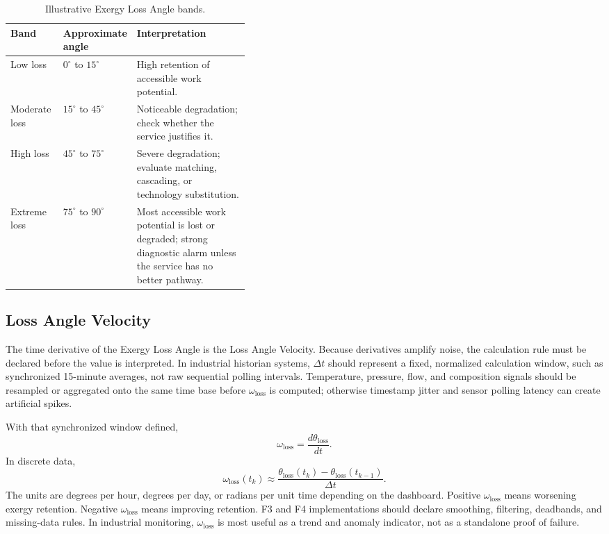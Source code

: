 \documentclass[11pt]{article}
\newcommand{\thetaloss}{\theta_{\mathrm{loss}}}
\newcommand{\omegaloss}{\omega_{\mathrm{loss}}}
\begin{document}
\begin{table}[H]
\centering
\caption{Illustrative Exergy Loss Angle bands.}
\begin{tabularx}{0.9\linewidth}{@{}p{0.22\linewidth}p{0.18\linewidth}X@{}}
\toprule
Band & Approximate angle & Interpretation \\
\midrule
Low loss & $0^{\circ}$ to $15^{\circ}$ & High retention of accessible work potential. \\
Moderate loss & $15^{\circ}$ to $45^{\circ}$ & Noticeable degradation; check whether the service justifies it. \\
High loss & $45^{\circ}$ to $75^{\circ}$ & Severe degradation; evaluate matching, cascading, or technology substitution. \\
Extreme loss & $75^{\circ}$ to $90^{\circ}$ & Most accessible work potential is lost or degraded; strong diagnostic alarm unless the service has no better pathway. \\
\bottomrule
\end{tabularx}
\end{table}

\subsection{Loss Angle Velocity}

The time derivative of the Exergy Loss Angle is the Loss Angle Velocity. Because derivatives amplify noise, the calculation rule must be declared before the value is interpreted. In industrial historian systems, $\Delta t$ should represent a fixed, normalized calculation window, such as synchronized 15-minute averages, not raw sequential polling intervals. Temperature, pressure, flow, and composition signals should be resampled or aggregated onto the same time base before $\omegaloss$ is computed; otherwise timestamp jitter and sensor polling latency can create artificial spikes.

With that synchronized window defined,
\begin{equation}
\omegaloss=\frac{d\thetaloss}{dt}.
\end{equation}
In discrete data,
\begin{equation}
\omegaloss(t_k)\approx \frac{\thetaloss(t_k)-\thetaloss(t_{k-1})}{\Delta t}.
\end{equation}
The units are degrees per hour, degrees per day, or radians per unit time depending on the dashboard. Positive $\omegaloss$ means worsening exergy retention. Negative $\omegaloss$ means improving retention. F3 and F4 implementations should declare smoothing, filtering, deadbands, and missing-data rules. In industrial monitoring, $\omegaloss$ is most useful as a trend and anomaly indicator, not as a standalone proof of failure.
\end{document}
